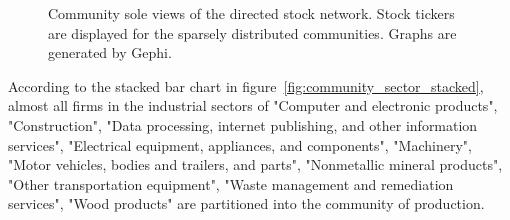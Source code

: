 \begin{figure}
{		\label{fig:community_3}%
	}%
	\hfill%
	\hfill%
	\caption{Community sole views of the directed stock network. Stock tickers are displayed for the sparsely distributed communities. Graphs are generated by Gephi.} \label{fig:distinctcommunities}
\end{figure}

According to the stacked bar chart in figure~\ref{fig:community_sector_stacked}, almost all firms in the industrial sectors of "Computer and electronic products", "Construction", "Data processing, internet publishing, and other information services", "Electrical equipment, appliances, and components", "Machinery", "Motor vehicles, bodies and trailers, and parts", "Nonmetallic mineral products", "Other transportation equipment", "Waste management and remediation services", "Wood products" are partitioned into the community of production.

